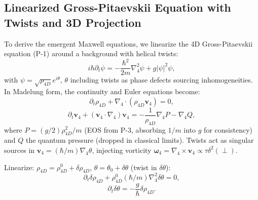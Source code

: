 \medskip
\noindent
{}
\medskip

\subsection{Linearized Gross-Pitaevskii Equation with Twists and 3D Projection}

To derive the emergent Maxwell equations, we linearize the 4D Gross-Pitaevskii equation (P-1) around a background with helical twists:
\begin{equation}
i \hbar \partial_t \psi = -\frac{\hbar^2}{2 m} \nabla_4^2 \psi + g |\psi|^2 \psi,
\end{equation}
with $\psi = \sqrt{\rho_{4D}} e^{i \theta}$, $\theta$ including twists as phase defects sourcing inhomogeneities. In Madelung form, the continuity and Euler equations become:
\begin{equation}
\partial_t \rho_{4D} + \nabla_4 \cdot (\rho_{4D} \mathbf{v}_4) = 0,
\end{equation}
\begin{equation}
\partial_t \mathbf{v}_4 + (\mathbf{v}_4 \cdot \nabla_4) \mathbf{v}_4 = -\frac{1}{\rho_{4D}} \nabla_4 P - \nabla_4 Q,
\end{equation}
where $P = (g / 2) \rho_{4D}^2 / m$ (EOS from P-3, absorbing $1/m$ into $g$ for consistency) and $Q$ the quantum pressure (dropped in classical limits). Twists act as singular sources in $\mathbf{v}_4 = (\hbar / m) \nabla_4 \theta$, injecting vorticity $\boldsymbol{\omega}_4 = \nabla_4 \times \mathbf{v}_4 \propto \tau \delta^2(\perp)$.

Linearize: $\rho_{4D} = \rho_{4D}^0 + \delta \rho_{4D}$, $\theta = \theta_0 + \delta \theta$ (twist in $\delta \theta$):
\begin{equation}
\partial_t \delta \rho_{4D} + \rho_{4D}^0 (\hbar / m) \nabla_4^2 \delta \theta = 0,
\end{equation}
\begin{equation}
\partial_t \delta \theta = -\frac{g}{\hbar} \delta \rho_{4D}.
\end{equation}

